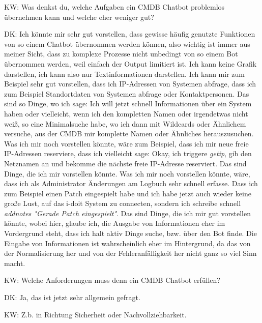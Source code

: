 \begin{list}{X:}{\setlength{\labelsep}{5mm}}
\item[KW:] Was denkst du, welche Aufgaben ein CMDB Chatbot problemlos übernehmen kann und welche eher weniger gut?
\item[DK:] Ich könnte mir sehr gut vorstellen, dass gewisse häufig genutzte Funktionen von so einem Chatbot übernommen werden können, also wichtig ist immer aus meiner Sicht, dass zu komplexe Prozesse nicht unbedingt von so einem Bot übernommen werden, weil einfach der Output limitiert ist. Ich kann keine Grafik darstellen, ich kann also nur Textinformationen darstellen. Ich kann mir zum Beispiel sehr gut vorstellen, dass ich IP-Adressen von Systemen abfrage, dass ich zum Beispiel Standortdaten von Systemen abfrage oder Kontaktpersonen. Das sind so Dinge, wo ich sage: Ich will jetzt schnell Informationen über ein System haben oder vielleicht, wenn ich den kompletten Namen oder irgendetwas nicht weiß, so eine Minimalsuche habe, wo ich dann mit Wildcards oder Ähnlichem versuche, aus der CMDB mir komplette Namen oder Ähnliches herauszusuchen. Was ich mir noch vorstellen könnte, wäre zum Beispiel, dass ich mir neue freie IP-Adressen reserviere, dass ich vielleicht sage: Okay, ich triggere \textit{getip}, gib den Netznamen an und bekomme die nächste freie IP-Adresse reserviert. Das sind Dinge, die ich mir vorstellen könnte. Was ich mir noch vorstellen könnte, wäre, dass ich als Administrator Änderungen am Logbuch sehr schnell erfasse. Dass ich zum Beispiel einen Patch eingespielt habe und ich habe jetzt auch wieder keine große Lust, auf das i-doit System zu connecten, sondern ich schreibe schnell \textit{addnotes "Gerade Patch eingespielt"}. Das sind Dinge, die ich mir gut vorstellen könnte, wobei hier, glaube ich, die Ausgabe von Informationen eher im Vordergrund steht, dass ich halt aktiv Dinge suche, bzw. über den Bot finde. Die Eingabe von Informationen ist wahrscheinlich eher im Hintergrund, da das von der Normalisierung her und von der Fehleranfälligkeit her nicht ganz so viel Sinn macht.
\item[KW:] Welche Anforderungen muss denn ein CMDB Chatbot erfüllen?
\item[DK:] Ja, das ist jetzt sehr allgemein gefragt.
\item[KW:] Z.b. in Richtung Sicherheit oder Nachvollziehbarkeit.

\end{list}
